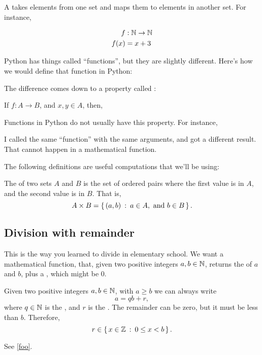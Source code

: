 A  takes elements from one set and maps
them to elements in another set. For instance,

\begin{align*}
  f & : \mathbb{N} \to \mathbb{N} \\
  f(x) & = x + 3
\end{align*}

Python has things called ``functions'', but they are slightly
different. Here's how we would define that function in Python:


The difference comes down to a property called :

\begin{axiom}
  \label{foo}
  If $f : A \to B$, and $x, y \in A$, then, 
\end{axiom}

Functions in Python do not usually have this property. For instance,


I called the same ``function'' with the same arguments, and got a
different result. That cannot happen in a mathematical function.

The following definitions are useful computations that we'll be using:

\begin{definition}
  The  of two sets $A$ and $B$ is the set of
  ordered pairs where the first value is in $A$, and the second value
  is in $B$. That is,
  $$A \times B = \left\{\, (a, b) \::\: a \in A, \text{ and } b \in B \,\right\}.$$
\end{definition}

\begin{definition}
    
\end{definition}

\subsection{Division with remainder}

This is the way you learned to divide in elementary school. We want a
mathematical function, that, given two positive integers $a, b \in
\mathbb{N}$, returns the  of $a$ and $b$, plus a
, which might be $0$.

\begin{lemma}
  Given two positive integers $a, b \in \mathbb{N}$, with $a \ge b$ we can
  always write $$a = qb + r,$$ where $q \in \mathbb{N}$ is the
  , and $r$ is the . The remainder can
  be zero, but it must be less than $b$. Therefore,
  $$r \in \left\{\, x \in \mathbb{Z} \::\: 0 \le x < b \,\right\}.$$
\end{lemma}


See \cref{foo}.